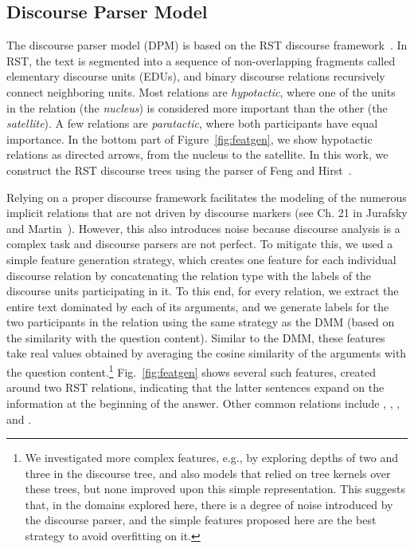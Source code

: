 \subsection{Discourse Parser Model}
\label{sec:features_parser}

The discourse parser model (DPM) is based on the RST discourse framework~\cite{mann88}. 
In RST, the text is segmented into a sequence of non-overlapping fragments called elementary discourse units (EDUs), and binary discourse relations recursively connect neighboring units. Most relations are {\em hypotactic}, where one of the units in the relation (the {\em nucleus}) is considered more important than the other (the {\em satellite}). A few relations are {\em paratactic}, where both participants have equal importance. In the bottom part of Figure~\ref{fig:featgen}, we show hypotactic relations as directed arrows, from the nucleus to the satellite. 
In this work, we construct the RST discourse trees using the parser of Feng and Hirst~. 

Relying on a proper discourse framework facilitates the modeling of the numerous implicit relations that are not driven by discourse markers (see Ch. 21 in Jurafsky and Martin~). However, this also introduces noise because discourse analysis is a complex task and discourse parsers are not perfect. 
To mitigate this, we used a simple feature generation strategy, which creates one feature for each individual discourse relation by concatenating the relation type with the labels of the discourse units participating in it. 
To this end, for every relation, we extract the entire text dominated by each of its arguments, and we generate labels for the two participants in the relation using the same strategy as the DMM (based on the similarity with the question content). 
Similar to the DMM, these features take real values obtained by averaging the cosine similarity of the arguments with the question content.\footnote{We investigated more complex features, e.g., by exploring depths of two and three in the discourse tree, and also models that relied on tree kernels over these trees, but none improved upon this simple representation. This suggests that, in the domains explored here, there is a degree of noise introduced by the discourse parser, and the simple features proposed here are the best strategy to avoid overfitting on it.} Fig.~\ref{fig:featgen} shows several such features, created around two RST  relations,  indicating that the latter sentences expand on the information at the beginning of the answer.  
Other common relations include , , , and .

